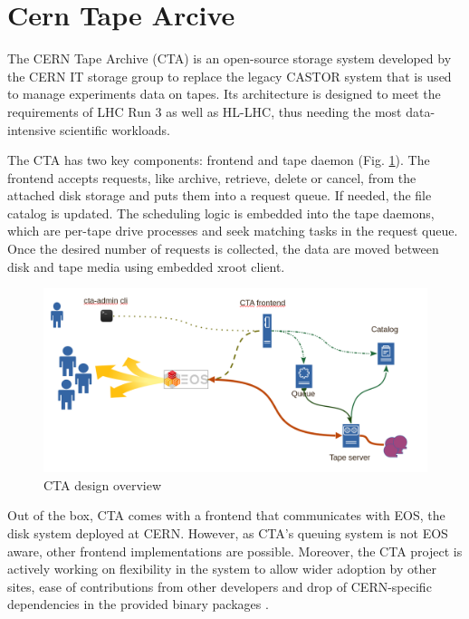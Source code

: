 \documentclass{webofc}
\begin{document}
\section{Cern Tape Arcive}
\label{sec:cta}

The CERN Tape Archive (CTA)\cite{cta} is an open-source storage system developed by the CERN IT storage group to
replace the legacy CASTOR system that is used to manage experiments data on tapes. Its architecture is designed
to meet the requirements of LHC Run 3 as well as HL-LHC, thus needing the most data-intensive scientific workloads.

The CTA has two key components: frontend and tape daemon (Fig. \ref{fig:cta_overview}). The frontend accepts requests, like archive, retrieve, delete or cancel, from the attached disk storage and puts them into a request queue. If needed, the file catalog is updated. The scheduling logic is embedded into the tape daemons, which are per-tape drive processes and seek matching tasks in the request queue. Once the desired number of requests is collected, the data are moved between disk and tape media using embedded xroot\cite{xrootd} client.

\begin{figure}[h]
    \centering
    \includegraphics[scale=0.25]{cta-design.png}
    \caption{CTA design overview}
    \label{fig:cta_overview}
\end{figure}

Out of the box, CTA comes with a frontend that communicates with EOS, the disk system deployed at CERN. However, as CTA's queuing system is not EOS aware, other frontend implementations are possible. Moreover, the CTA project is actively working on flexibility in the system to allow wider adoption by other sites, ease of contributions from other developers and drop of CERN-specific dependencies in the provided binary packages \cite{cta_beyond_cern}.
\end{document}
